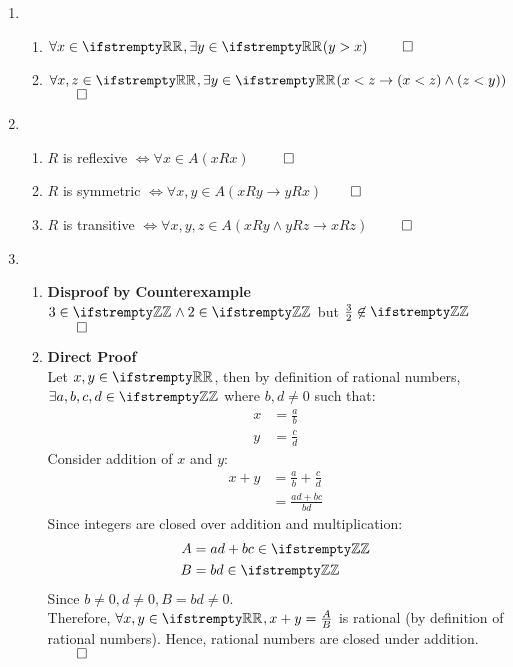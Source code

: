 \documentclass[12pt, a4paper]{article}
\begin{document}
\begin{enumerate}[Q\arabic*.]
  \item \begin{enumerate}[(\alph*)]
      \item $\forall x \in \RR,\exists y \in \RR (y > x)$  $\qed$
      \item $\forall x,z\in \RR, \exists y\in\RR(x<z \rightarrow (x < z) \land (z < y))$ $\qed$
    \end{enumerate}

  \item \begin{enumerate}[(\alph*)]
      \item $R$ is reflexive $\iff \forall x \in A (xRx)$ $\qed$
      \item $R$ is symmetric $\iff \forall x,y \in A (xRy \rightarrow yRx)$$\qed$ 
      \item $R$ is transitive $\iff \forall x,y,z \in A (xRy \land yRz \rightarrow xRz)$ $\qed$
    \end{enumerate}

  \item \begin{enumerate}[(\alph*)]
    \item \textbf{Disproof by Counterexample}\\
      $3 \in \ZZ \land 2 \in \ZZ$ but $\frac{3}{2} \not\in \ZZ$$\qed$
    \item \textbf{Direct Proof}\\
      Let $x, y \in \RR$, then by definition of rational numbers, $\exists a,b,c,d \in \ZZ$ where $b,d\neq 0$ such that:
      \begin{align*}
        x &= \frac{a}{b}\\
        y &= \frac{c}{d}
      \end{align*}
      Consider addition of $x$ and $y$:
      \begin{align*}
        x+y &= \frac{a}{b} + \frac{c}{d} \\
            &= \frac{ad + bc}{bd}
      \end{align*}
      Since integers are closed over addition and multiplication:
      \begin{align*}
        A &= ad+bc \in \ZZ\\
        B &= bd \in \ZZ
      \end{align*}
      Since $b \neq 0, d \neq 0, B = bd\neq 0.$\\
      Therefore, $\forall x,y\in \RR, x+y=\frac{A}{B}$ is rational (by definition of rational numbers). Hence, rational numbers are closed under addition.$\qed$


\end{enumerate}
\end{enumerate}
\end{document}
